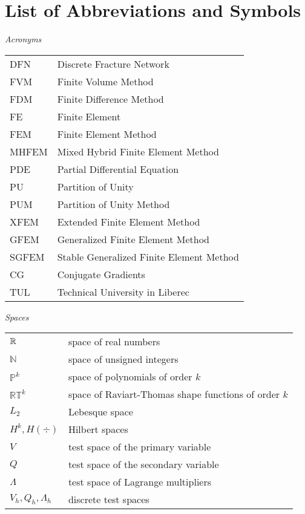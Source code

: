 \section*{List of Abbreviations and Symbols}

\noindent\emph{Acronyms}
\vspace{0.5cm}

\begin{tabularx}{\linewidth}{@{}lX@{}}
DFN & Discrete Fracture Network \\
FVM & Finite Volume Method \\
FDM & Finite Difference Method \\
FE & Finite Element \\
FEM & Finite Element Method \\
MHFEM & Mixed Hybrid Finite Element Method \\
PDE & Partial Differential Equation \\
PU & Partition of Unity \\
PUM & Partition of Unity Method \\
XFEM & Extended Finite Element Method \\
GFEM & Generalized Finite Element Method \\
SGFEM & Stable Generalized Finite Element Method \\
CG & Conjugate Gradients \\
TUL & Technical University in Liberec
\end{tabularx}
\vspace{1cm}

\noindent\emph{Spaces}
\vspace{0.5cm}

\begin{tabularx}{\linewidth}{@{}lX@{}}
$\mathbb{R}$ & space of real numbers  \\
$\mathbb N$ & space of unsigned integers \\
$\mathbb P^k$ & space of polynomials of order $k$  \\
$\mathbb {RT}^k$ & space of Raviart-Thomas shape functions of order $k$  \\
$L_2$ & Lebesque space \\
$H^k, H(\div)$ & Hilbert spaces \\
$V$ & test space of the primary variable \\
$Q$ & test space of the secondary variable \\
$\Lambda$ & test space of Lagrange multipliers\\
$V_h, Q_h, \Lambda_h$ & discrete test spaces\\
\end{tabularx}
\pagebreak

